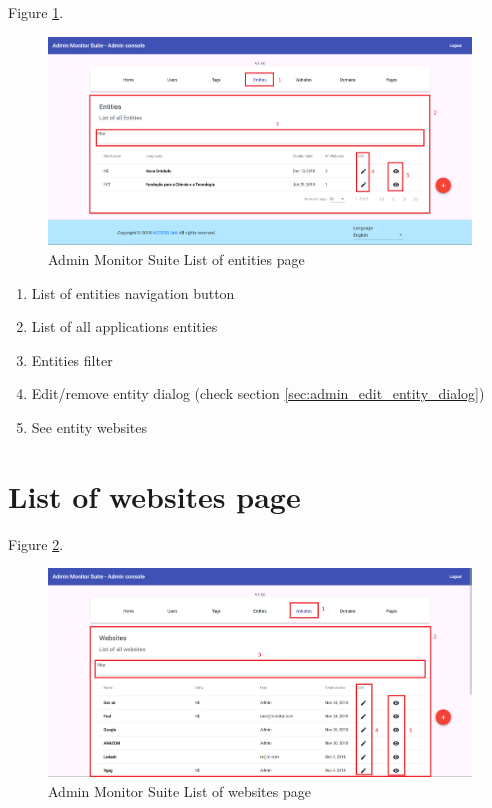Figure \ref{fig:admin_list_entities_page}.

\begin{figure}[H]
    \centering
    \includegraphics[width=\linewidth]{lib/images/admin/admin_list_entities_page.png}
    \caption{Admin Monitor Suite List of entities page}
    \label{fig:admin_list_entities_page}
\end{figure}

\begin{enumerate}
    \item List of entities navigation button
    \item List of all applications entities
    \item Entities filter
    \item Edit/remove entity dialog (check section \ref{sec:admin_edit_entity_dialog})
    \item See entity websites
\end{enumerate}

\clearpage

\section{List of websites page}

Figure \ref{fig:admin_list_websites_page}.

\begin{figure}[H]
    \centering
    \includegraphics[width=\linewidth]{lib/images/admin/admin_list_websites_page.png}
    \caption{Admin Monitor Suite List of websites page}
    \label{fig:admin_list_websites_page}
\end{figure}

